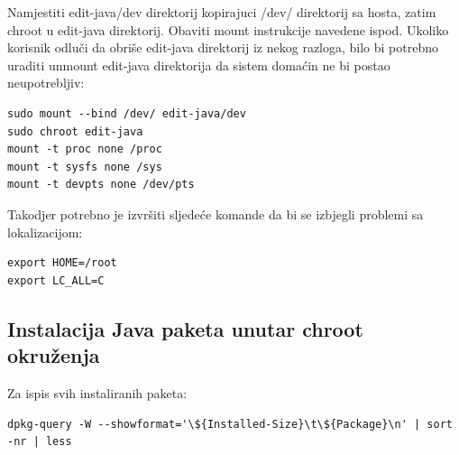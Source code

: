 \documentclass[12pt,vi]{mitthesis}
\begin{document}
\noindent
Namjestiti edit-java/dev direktorij kopirajuci /dev/ direktorij sa hosta, zatim chroot u edit-java direktorij.
Obaviti mount instrukcije navedene ispod. Ukoliko korisnik odluči da obriše edit-java direktorij iz nekog razloga,
bilo bi potrebno uraditi unmount edit-java direktorija da sistem domaćin ne bi postao neupotrebljiv:
\begin{lstlisting}[style=BashInputStyle]
sudo mount --bind /dev/ edit-java/dev
sudo chroot edit-java
mount -t proc none /proc
mount -t sysfs none /sys
mount -t devpts none /dev/pts
\end{lstlisting}

\noindent
Takodjer potrebno je izvršiti sljedeće komande da bi se izbjegli problemi sa lokalizacijom:
\begin{lstlisting}[style=BashInputStyle]
export HOME=/root
export LC_ALL=C
\end{lstlisting}

\subsection*{Instalacija Java paketa unutar chroot okruženja}
\noindent
Za ispis svih instaliranih paketa:
\begin{lstlisting}[style=BashInputStyle]
dpkg-query -W --showformat='\${Installed-Size}\t\${Package}\n' | sort -nr | less
\end{lstlisting}
\end{document}
